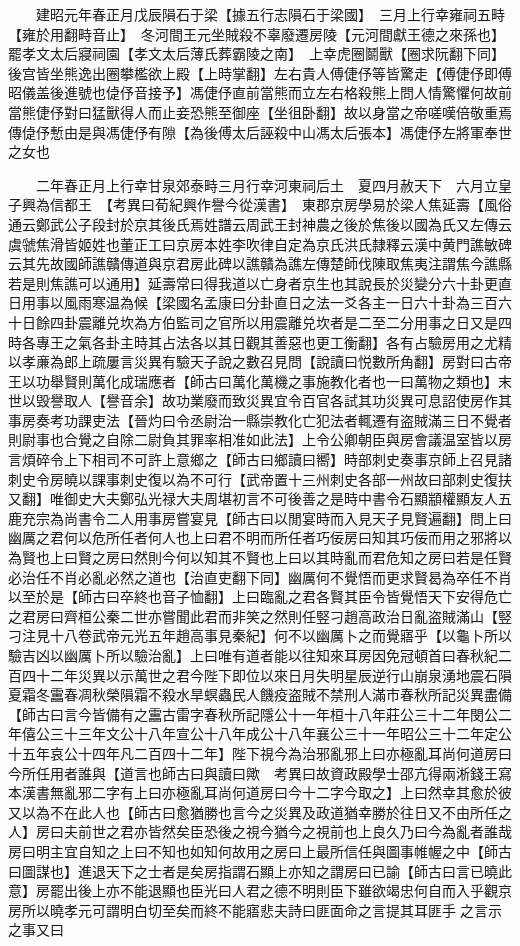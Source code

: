 　　建昭元年春正月戊辰隕石于梁【據五行志隕石于梁國】　三月上行幸雍祠五畤【雍於用翻畤音止】　冬河間王元坐賊殺不辜廢遷房陵【元河間獻王德之來孫也】　罷孝文太后寢祠園【孝文太后薄氏葬霸陵之南】　上幸虎圈鬬獸【圈求阮翻下同】後宫皆坐熊逸出圈攀檻欲上殿【上時掌翻】左右貴人傅倢伃等皆驚走【傅倢伃即傅昭儀盖後進號也偼伃音接予】馮倢伃直前當熊而立左右格殺熊上問人情驚懼何故前當熊倢伃對曰猛獸得人而止妾恐熊至御座【坐徂卧翻】故以身當之帝嗟嘆倍敬重焉傳偼伃慙由是與馮倢伃有隙【為後傅太后誣殺中山馮太后張本】馮倢伃左將軍奉世之女也

　　二年春正月上行幸甘泉郊泰畤三月行幸河東祠后土　夏四月赦天下　六月立皇子興為信都王　【考異曰荀紀興作譽今從漢書】　東郡京房學易於梁人焦延壽【風俗通云鄭武公子段封於京其後氏焉姓譜云周武王封神農之後於焦後以國為氏又左傳云虞虢焦滑皆姬姓也董正工曰京房本姓李吹律自定為京氏洪氏隸釋云漢中黄門譙敏碑云其先故國師譙贛傳道與京君房此碑以譙贛為譙左傳楚師伐陳取焦夷注謂焦今譙縣若是則焦譙可以通用】延壽常曰得我道以亡身者京生也其說長於災變分六十卦更直日用事以風雨寒温為候【梁國名孟康曰分卦直日之法一爻各主一日六十卦為三百六十日餘四卦震離兑坎為方伯監司之官所以用震離兑坎者是二至二分用事之日又是四時各專王之氣各卦主時其占法各以其日觀其善惡也更工衡翻】各有占驗房用之尤精以孝亷為郎上疏屢言災異有驗天子說之數召見問【說讀曰悦數所角翻】房對曰古帝王以功舉賢則萬化成瑞應者【師古曰萬化萬機之事施教化者也一曰萬物之類也】末世以毁譽取人【譽音余】故功業廢而致災異宜令百官各試其功災異可息詔使房作其事房奏考功課吏法【晉灼曰令丞尉治一縣崇教化亡犯法者輒遷有盗賊滿三日不覺者則尉事也合覺之自除二尉負其罪率相准如此法】上令公卿朝臣與房會議温室皆以房言煩碎令上下相司不可許上意鄉之【師古曰鄉讀曰嚮】時部刺史奏事京師上召見諸刺史令房曉以課事刺史復以為不可行【武帝置十三州刺史各部一州故曰部刺史復扶又翻】唯御史大夫鄭弘光禄大夫周堪初言不可後善之是時中書令石顯顓權顯友人五鹿充宗為尚書令二人用事房嘗宴見【師古曰以閒宴時而入見天子見賢遍翻】問上曰幽厲之君何以危所任者何人也上曰君不明而所任者巧佞房曰知其巧佞而用之邪將以為賢也上曰賢之房曰然則今何以知其不賢也上曰以其時亂而君危知之房曰若是任賢必治任不肖必亂必然之道也【治直吏翻下同】幽厲何不覺悟而更求賢曷為卒任不肖以至於是【師古曰卒終也音子恤翻】上曰臨亂之君各賢其臣令皆覺悟天下安得危亡之君房曰齊桓公秦二世亦嘗聞此君而非笑之然則任竪刁趙高政治日亂盗賊滿山【竪刁注見十八卷武帝元光五年趙高事見秦紀】何不以幽厲卜之而覺寤乎【以龜卜所以驗吉凶以幽厲卜所以驗治亂】上曰唯有道者能以往知來耳房因免冠頓首曰春秋紀二百四十二年災異以示萬世之君今陛下即位以來日月失明星辰逆行山崩泉湧地震石隕夏霜冬靁春凋秋榮隕霜不殺水旱螟蟲民人饑疫盗賊不禁刑人滿市春秋所記災異盡備【師古曰言今皆備有之靁古雷字春秋所記隱公十一年桓十八年莊公三十二年閔公二年僖公三十三年文公十八年宣公十八年成公十八年襄公三十一年昭公三十二年定公十五年哀公十四年凡二百四十二年】陛下視今為治邪亂邪上曰亦極亂耳尚何道房曰今所任用者誰與【道言也師古曰與讀曰歟　考異曰故資政殿學士邵亢得兩淅錢王寫本漢書無亂邪二字有上曰亦極亂耳尚何道房曰今十二字今取之】上曰然幸其愈於彼又以為不在此人也【師古曰愈猶勝也言今之災異及政道猶幸勝於往日又不由所任之人】房曰夫前世之君亦皆然矣臣恐後之視今猶今之視前也上良久乃曰今為亂者誰哉房曰明主宜自知之上曰不知也如知何故用之房曰上最所信任與圖事帷幄之中【師古曰圖謀也】進退天下之士者是矣房指謂石顯上亦知之謂房曰已諭【師古曰言已曉此意】房罷出後上亦不能退顯也臣光曰人君之德不明則臣下雖欲竭忠何自而入乎觀京房所以曉孝元可謂明白切至矣而終不能寤悲夫詩曰匪面命之言提其耳匪手之言示之事又曰